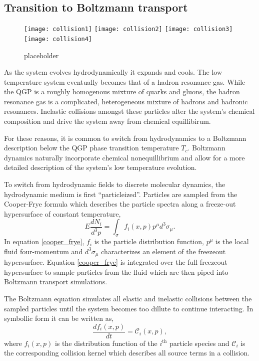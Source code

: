 \documentclass[aps,prc,reprint,amsmath,nofootinbib]{revtex4-1}
\begin{document}
\subsection{Transition to Boltzmann transport}

\begin{figure}
 \texttt{[image: collision1]}
 \texttt{[image: collision2]}
 \texttt{[image: collision3]}
 \texttt{[image: collision4]}
 \caption{\label{fig:spacetime} placeholder}
\end{figure}

As the system evolves hydrodynamically it expands and cools. The low temperature system eventually becomes that of a hadron resonance gas. While the QGP is a 
roughly homogenous mixture of quarks and gluons, the hadron resonance gas is a complicated, heterogeneous mixture of hadrons and hadronic resonances. Inelastic collisions 
amongst these particles alter the system's chemical composition and drive the system away from chemical equillibirum. 

For these reasons, it is common to switch from hydrodynamics to a Boltzmann description below the QGP phase transition temperature $T_c$. Boltzmann dynamics naturally 
incorporate chemical nonequillibrium and allow for a more detailed description of the system's low temperature evolution.

To switch from hydrodynamic fields to discrete molecular dynamics, the hydrodynamic medium is first ``particleized''. Particles are sampled from the Cooper-Frye formula 
which describes the particle spectra along a freeze-out hypersurface of constant temperature,
\begin{equation}
 \label{cooper_frye}
 E \frac{dN_i}{d^3p} = \int_\sigma f_i(x,p) p^\mu d^3\sigma_\mu.
\end{equation}
In equation \ref{cooper_frye}, $f_i$ is the particle distribution function, $p^\mu$ is the local fluid four-momentum and $d^3\sigma_\mu$ characterizes an element of the freezeout hypersurface. Equation
\ref{cooper_frye} is integrated over the full freezeout hypersurface to sample particles from the fluid which are then piped into Boltzmann transport simulations.

The Boltzmann equation simulates all elastic and inelastic collisions between the sampled particles until the system becomes too dillute to continue interacting. In symbollic
form it can be written as,
\begin{equation}
 \label{boltzmann_eqn}
 \frac{df_i(x,p)}{dt} = \mathcal{C}_i (x,p),
\end{equation}
where $f_i(x,p)$ is the distribution function of the $i^\mathrm{th}$ particle species and $\mathcal{C}_i$ is the corresponding collision kernel which describes all source 
terms in a collision.
\end{document}
